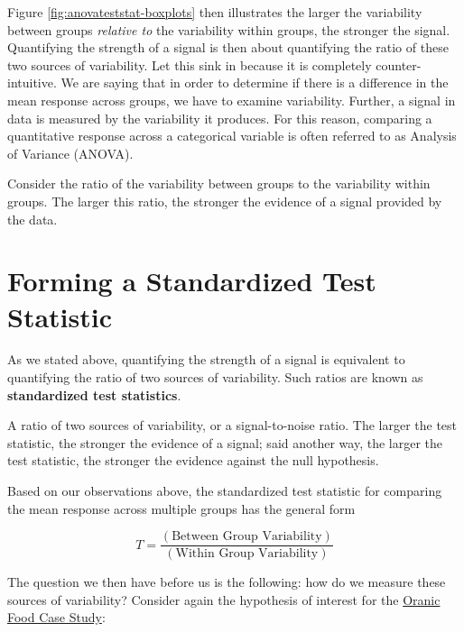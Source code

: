 \documentclass[]{book}
\theoremstyle{definition}
\theoremstyle{definition}
\theoremstyle{definition}
\theoremstyle{remark}
\let\BeginKnitrBlock\begin \let\EndKnitrBlock\end
\begin{document}
Figure \ref{fig:anovateststat-boxplots} then illustrates the larger the
variability between groups \emph{relative to} the variability within
groups, the stronger the signal. Quantifying the strength of a signal is
then about quantifying the ratio of these two sources of variability.
Let this sink in because it is completely counter-intuitive. We are
saying that in order to determine if there is a difference in the mean
response across groups, we have to examine variability. Further, a
signal in data is measured by the variability it produces. For this
reason, comparing a quantitative response across a categorical variable
is often referred to as Analysis of Variance (ANOVA).

\BeginKnitrBlock{rmdkeyidea}
Consider the ratio of the variability between groups to the variability
within groups. The larger this ratio, the stronger the evidence of a
signal provided by the data.
\EndKnitrBlock{rmdkeyidea}

\section{Forming a Standardized Test
Statistic}\label{forming-a-standardized-test-statistic}

As we stated above, quantifying the strength of a signal is equivalent
to quantifying the ratio of two sources of variability. Such ratios are
known as \textbf{standardized test statistics}.

\BeginKnitrBlock{definition}[Standardized Test Statistic]
\protect\hypertarget{def:defn-standardized-test-statistic}{}{\label{def:defn-standardized-test-statistic}
{} }A ratio of two sources of
variability, or a signal-to-noise ratio. The larger the test statistic,
the stronger the evidence of a signal; said another way, the larger the
test statistic, the stronger the evidence against the null hypothesis.
\EndKnitrBlock{definition}

Based on our observations above, the standardized test statistic for
comparing the mean response across multiple groups has the general form

\begin{equation}
  T = \frac{(\text{Between Group Variability})}{(\text{Within Group Variability})}
  \label{eq:general-test-stat}
\end{equation}

The question we then have before us is the following: how do we measure
these sources of variability? Consider again the hypothesis of interest
for the \protect\hyperlink{CaseOrganic}{Oranic Food Case Study}:
\end{document}
